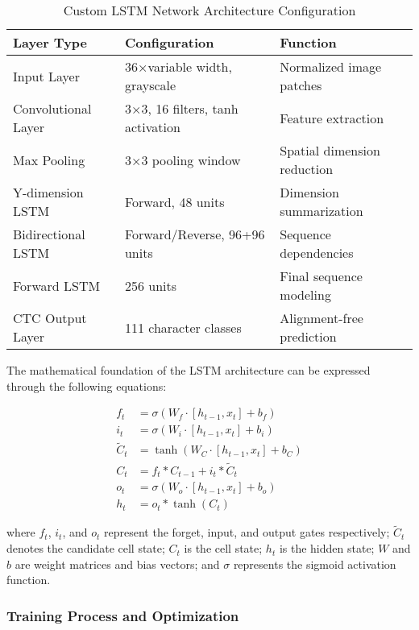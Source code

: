 \begin{table}[H]
\centering
\caption{Custom LSTM Network Architecture Configuration}
\label{tab:lstm_architecture}
{\begin{tabular}{lll}
\toprule
\textbf{Layer Type} & \textbf{Configuration} & \textbf{Function} \\
\midrule
Input Layer & 36×variable width, grayscale & Normalized image patches \\
Convolutional Layer & 3×3, 16 filters, tanh activation & Feature extraction \\
Max Pooling & 3×3 pooling window & Spatial dimension reduction \\
Y-dimension LSTM & Forward, 48 units & Dimension summarization \\
Bidirectional LSTM & Forward/Reverse, 96+96 units & Sequence dependencies \\
Forward LSTM & 256 units & Final sequence modeling \\
CTC Output Layer & 111 character classes & Alignment-free prediction \\
\bottomrule
\end{tabular}}
\end{table}

The mathematical foundation of the LSTM architecture can be expressed through the following equations:

\begin{align}
    f_t &= \sigma(W_f \cdot [h_{t-1}, x_t] + b_f) \\
    i_t &= \sigma(W_i \cdot [h_{t-1}, x_t] + b_i) \\
    \tilde{C}_t &= \tanh(W_C \cdot [h_{t-1}, x_t] + b_C) \\
    C_t &= f_t * C_{t-1} + i_t * \tilde{C}_t \\
    o_t &= \sigma(W_o \cdot [h_{t-1}, x_t] + b_o) \\
    h_t &= o_t * \tanh(C_t)
\end{align}

where $f_t$, $i_t$, and $o_t$ represent the forget, input, and output gates respectively; $\tilde{C}_t$ denotes the candidate cell state; $C_t$ is the cell state; $h_t$ is the hidden state; $W$ and $b$ are weight matrices and bias vectors; and $\sigma$ represents the sigmoid activation function.

\subsubsection{Training Process and Optimization}

